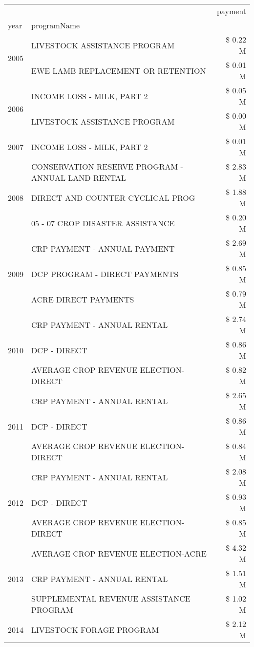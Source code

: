 \begin{tabular}{llr}
\toprule
 &  & payment \\
year & programName &  \\
\midrule
\multirow[t]{2}{*}{2005} & LIVESTOCK ASSISTANCE PROGRAM & \$ 0.22 M \\
 & EWE LAMB REPLACEMENT OR RETENTION & \$ 0.01 M \\
\cline{1-3}
\multirow[t]{2}{*}{2006} & INCOME LOSS - MILK, PART 2 & \$ 0.05 M \\
 & LIVESTOCK ASSISTANCE PROGRAM & \$ 0.00 M \\
\cline{1-3}
2007 & INCOME LOSS - MILK, PART 2 & \$ 0.01 M \\
\cline{1-3}
\multirow[t]{3}{*}{2008} & CONSERVATION RESERVE PROGRAM - ANNUAL LAND RENTAL & \$ 2.83 M \\
 & DIRECT AND COUNTER CYCLICAL PROG & \$ 1.88 M \\
 & 05 - 07 CROP DISASTER ASSISTANCE & \$ 0.20 M \\
\cline{1-3}
\multirow[t]{3}{*}{2009} & CRP PAYMENT - ANNUAL PAYMENT & \$ 2.69 M \\
 & DCP PROGRAM - DIRECT PAYMENTS & \$ 0.85 M \\
 & ACRE DIRECT PAYMENTS & \$ 0.79 M \\
\cline{1-3}
\multirow[t]{3}{*}{2010} & CRP PAYMENT - ANNUAL RENTAL & \$ 2.74 M \\
 & DCP - DIRECT & \$ 0.86 M \\
 & AVERAGE CROP REVENUE ELECTION-DIRECT & \$ 0.82 M \\
\cline{1-3}
\multirow[t]{3}{*}{2011} & CRP PAYMENT - ANNUAL RENTAL & \$ 2.65 M \\
 & DCP - DIRECT & \$ 0.86 M \\
 & AVERAGE CROP REVENUE ELECTION-DIRECT & \$ 0.84 M \\
\cline{1-3}
\multirow[t]{3}{*}{2012} & CRP PAYMENT - ANNUAL RENTAL & \$ 2.08 M \\
 & DCP - DIRECT & \$ 0.93 M \\
 & AVERAGE CROP REVENUE ELECTION-DIRECT & \$ 0.85 M \\
\cline{1-3}
\multirow[t]{3}{*}{2013} & AVERAGE CROP REVENUE ELECTION-ACRE & \$ 4.32 M \\
 & CRP PAYMENT - ANNUAL RENTAL & \$ 1.51 M \\
 & SUPPLEMENTAL REVENUE ASSISTANCE PROGRAM & \$ 1.02 M \\
\cline{1-3}
\multirow[t]{3}{*}{2014} & LIVESTOCK FORAGE PROGRAM & \$ 2.12 M \\

\end{tabular}
